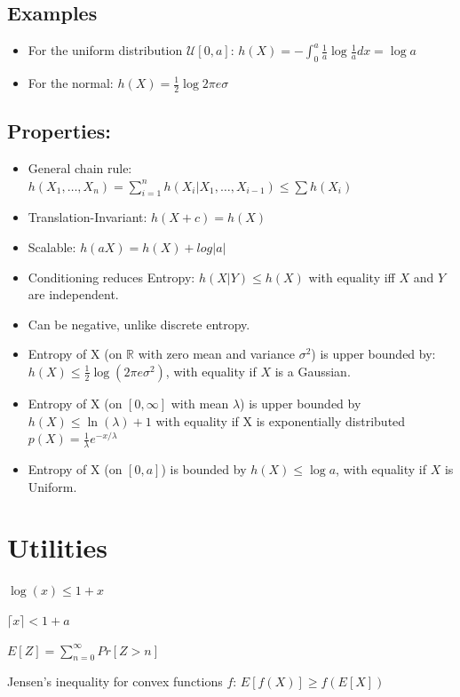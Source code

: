 \documentclass[10pt,a4paper,landscape]{article}
\begin{document}
\begin{multicols*}{4}
\subsection{Examples}
\begin{itemize}
	\item For the uniform distribution $\mathcal{U}[0, a]$:
	$h(X) = - \int_0^a \frac{1}{a} \log \frac{1}{a} dx = \log a$
	\item For the normal:
	$h(X) = \frac{1}{2} \log 2 \pi e \sigma$
\end{itemize}


\subsection{Properties:}
\begin{itemize}
	\item General chain rule: $h(X_1, \ldots, X_n) = \sum_{i=1}^{n} h(X_i|X_1, \ldots, X_{i-1}) \leq \sum h(X_i)$
	\item Translation-Invariant: $h(X + c) = h(X)$
	\item Scalable: $h(aX) = h(X) + log|a|$
	\item Conditioning reduces Entropy: $h(X|Y) \leq h(X)$ with equality iff $X$ and $Y$ are independent.
	\item Can be negative, unlike discrete entropy.
	\item Entropy of X (on $\mathbb{R}$ with zero mean and variance $\sigma^2$) is upper bounded by: $h(X) \leq \frac{1}{2} \log ( 2\pi e \sigma^2)$, with equality if $X$ is a Gaussian.
	\item Entropy of X (on $[0, \infty]$ with mean $\lambda$) is upper bounded by $h(X) \leq \ln(\lambda) + 1$ with equality if X is exponentially distributed $p(X) = \frac{1}{\lambda} e^{-x/\lambda}$
	\item Entropy of X (on $[0, a]$) is bounded by $h(X) \leq \log a$, with equality if $X$ is Uniform.
\end{itemize}





\section{Utilities}
$\log(x) \leq 1 + x$

$\lceil x \rceil < 1 + a$

$E[Z] = \sum_{n=0}^{\infty} Pr[Z > n]$

Jensen's inequality for convex functions $f$: $ E[f(X)] \geq f(E[X])$


\end{multicols*}
\end{document}
